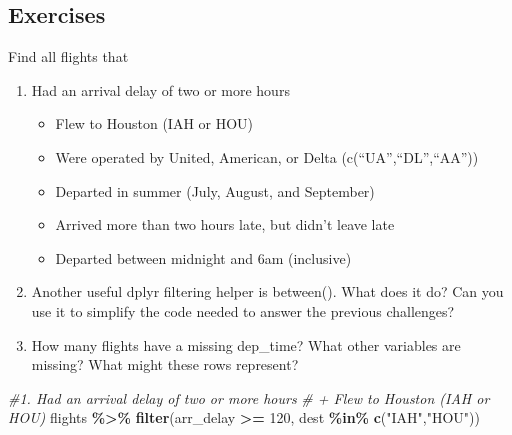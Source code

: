 \documentclass[
]{article}
\newenvironment{Shaded}{\begin{snugshade}}{\end{snugshade}}
\newcommand{\CommentTok}[1]{\textcolor[rgb]{0.56,0.35,0.01}{\textit{#1}}}
\newcommand{\DecValTok}[1]{\textcolor[rgb]{0.00,0.00,0.81}{#1}}
\newcommand{\FunctionTok}[1]{\textcolor[rgb]{0.13,0.29,0.53}{\textbf{#1}}}
\newcommand{\NormalTok}[1]{#1}
\newcommand{\SpecialCharTok}[1]{\textcolor[rgb]{0.81,0.36,0.00}{\textbf{#1}}}
\newcommand{\StringTok}[1]{\textcolor[rgb]{0.31,0.60,0.02}{#1}}
\providecommand{\tightlist}{%
  \setlength{\itemsep}{0pt}\setlength{\parskip}{0pt}}
\begin{document}
\hypertarget{exercises}{%
\subsection{Exercises}\label{exercises}}

Find all flights that

\begin{enumerate}
\def\labelenumi{\arabic{enumi}.}
\item
  Had an arrival delay of two or more hours

  \begin{itemize}
  \tightlist
  \item
    Flew to Houston (IAH or HOU)
  \item
    Were operated by United, American, or Delta
    (c(``UA'',``DL'',``AA''))
  \item
    Departed in summer (July, August, and September)
  \item
    Arrived more than two hours late, but didn't leave late
  \item
    Departed between midnight and 6am (inclusive)
  \end{itemize}
\item
  Another useful dplyr filtering helper is between(). What does it do?
  Can you use it to simplify the code needed to answer the previous
  challenges?
\item
  How many flights have a missing dep\_time? What other variables are
  missing? What might these rows represent?
\end{enumerate}

\begin{Shaded}
\begin{Highlighting}[]
\CommentTok{\#1. Had an arrival delay of two or more hours}
  \CommentTok{\#    + Flew to Houston (IAH or HOU) }
\NormalTok{  flights }\SpecialCharTok{\%\textgreater{}\%} \FunctionTok{filter}\NormalTok{(arr\_delay }\SpecialCharTok{\textgreater{}=} \DecValTok{120}\NormalTok{, dest }\SpecialCharTok{\%in\%} \FunctionTok{c}\NormalTok{(}\StringTok{"IAH"}\NormalTok{,}\StringTok{"HOU"}\NormalTok{))}
\end{Highlighting}
\end{Shaded}
\end{document}
